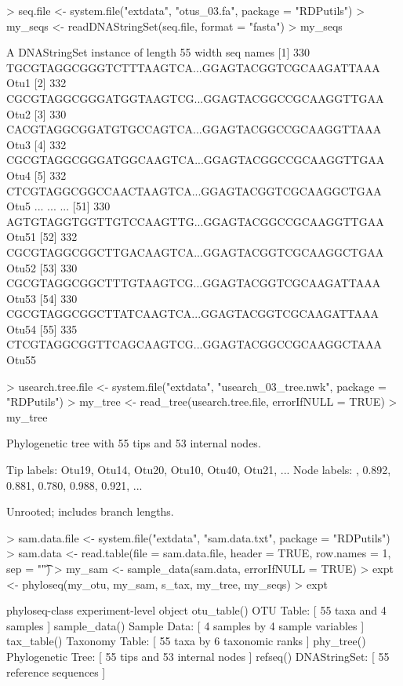 \documentclass{article}
\begin{document}
\begin{Schunk}
\begin{Sinput}
> seq.file <- system.file("extdata", "otus_03.fa", package = "RDPutils")
> my_seqs <- readDNAStringSet(seq.file, format = "fasta")
> my_seqs
\end{Sinput}
\begin{Soutput}
  A DNAStringSet instance of length 55
     width seq                                              names               
 [1]   330 TGCGTAGGCGGGTCTTTAAGTCA...GGAGTACGGTCGCAAGATTAAA Otu1
 [2]   332 CGCGTAGGCGGGATGGTAAGTCG...GGAGTACGGCCGCAAGGTTGAA Otu2
 [3]   330 CACGTAGGCGGATGTGCCAGTCA...GGAGTACGGCCGCAAGGTTAAA Otu3
 [4]   332 CGCGTAGGCGGGATGGCAAGTCA...GGAGTACGGCCGCAAGGTTGAA Otu4
 [5]   332 CTCGTAGGCGGCCAACTAAGTCA...GGAGTACGGTCGCAAGGCTGAA Otu5
 ...   ... ...
[51]   330 AGTGTAGGTGGTTGTCCAAGTTG...GGAGTACGGCCGCAAGGTTGAA Otu51
[52]   332 CGCGTAGGCGGCTTGACAAGTCA...GGAGTACGGTCGCAAGGCTGAA Otu52
[53]   330 CGCGTAGGCGGCTTTGTAAGTCG...GGAGTACGGTCGCAAGATTAAA Otu53
[54]   330 CGCGTAGGCGGCTTATCAAGTCA...GGAGTACGGTCGCAAGATTAAA Otu54
[55]   335 CTCGTAGGCGGTTCAGCAAGTCG...GGAGTACGGCCGCAAGGCTAAA Otu55
\end{Soutput}
\begin{Sinput}
> usearch.tree.file <- system.file("extdata", "usearch_03_tree.nwk", package = "RDPutils")
> my_tree <- read_tree(usearch.tree.file, errorIfNULL = TRUE)
> my_tree
\end{Sinput}
\begin{Soutput}
Phylogenetic tree with 55 tips and 53 internal nodes.

Tip labels:
	Otu19, Otu14, Otu20, Otu10, Otu40, Otu21, ...
Node labels:
	, 0.892, 0.881, 0.780, 0.988, 0.921, ...

Unrooted; includes branch lengths.
\end{Soutput}
\begin{Sinput}
> sam.data.file <- system.file("extdata", "sam.data.txt", package = "RDPutils")
> sam.data <- read.table(file = sam.data.file, header = TRUE, row.names = 1, sep = "\t")
> my_sam <- sample_data(sam.data, errorIfNULL = TRUE)
> expt <- phyloseq(my_otu, my_sam, s_tax, my_tree, my_seqs)
> expt
\end{Sinput}
\begin{Soutput}
phyloseq-class experiment-level object
otu_table()   OTU Table:         [ 55 taxa and 4 samples ]
sample_data() Sample Data:       [ 4 samples by 4 sample variables ]
tax_table()   Taxonomy Table:    [ 55 taxa by 6 taxonomic ranks ]
phy_tree()    Phylogenetic Tree: [ 55 tips and 53 internal nodes ]
refseq()      DNAStringSet:      [ 55 reference sequences ]
\end{Soutput}
\end{Schunk}
\end{document}
